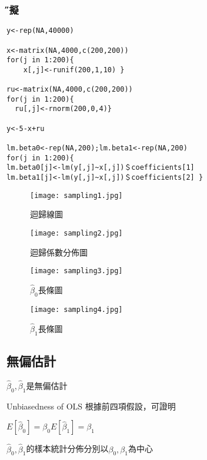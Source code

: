 \documentclass[xcolor=dvipsnames]{beamer}
\begin{document}
\begin{frame}[fragile=singleslide]\frametitle{\H 模擬}
\begin{Verbatim}[frame=single,label=R code,
formatcom=\color{blue},fontseries=b,xleftmargin=2mm]
y<-rep(NA,40000)

x<-matrix(NA,4000,c(200,200))
for(j in 1:200){
    x[,j]<-runif(200,1,10) }

ru<-matrix(NA,4000,c(200,200))
for(j in 1:200){
  ru[,j]<-rnorm(200,0,4)}

y<-5-x+ru

lm.beta0<-rep(NA,200);lm.beta1<-rep(NA,200)
for(j in 1:200){
lm.beta0[j]<-lm(y[,j]~x[,j])＄coefficients[1]
lm.beta1[j]<-lm(y[,j]~x[,j])＄coefficients[2] }
\end{Verbatim}
\end{frame}
\begin{frame}
\begin{figure}
\texttt{[image: sampling1.jpg]}
\caption{迴歸線圖}
\end{figure}
\end{frame}
\begin{frame}
\begin{figure}
\texttt{[image: sampling2.jpg]}
\caption{迴歸係數分佈圖}
\end{figure}
\end{frame}
\begin{frame}
\begin{figure}
\texttt{[image: sampling3.jpg]}
\caption{$\hat{\beta}_{0} $長條圖}
\end{figure}
\end{frame}
\begin{frame}
\begin{figure}
\texttt{[image: sampling4.jpg]}
\caption{$\hat{\beta}_{1} $長條圖}
\end{figure}
\end{frame}

\subsection{無偏估計}
\begin{frame}{ $\hat{\beta}_{0},\hat{\beta}_{1}$是無偏估計}
\begin{block}{Unbiasedness of OLS}
根據前四項假設，可證明
\begin{center}
$E[\hat{\beta}_{0}]=\beta_{0}   $\qquad$E[\hat{\beta}_{1}]=\beta_{1} $
\end{center}
$\hat{\beta}_{0}, \hat{\beta}_{1}$的樣本統計分佈分別以$\beta_{0}, \beta_{1}$為中心
\end{block}
\end{frame}
\end{document}
